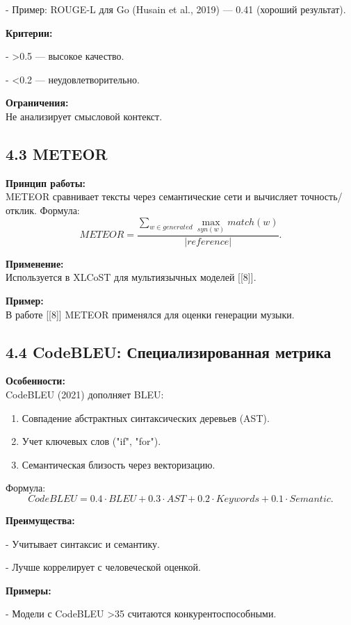 \documentclass[14pt]{article}
\theoremstyle{definition}
\begin{document}
- Пример: ROUGE-L для Go (Husain et al., 2019) — 0.41 (хороший результат).


\textbf{Критерии:}

    
- >0.5 — высокое качество.
    
- <0.2 — неудовлетворительно.


\textbf{Ограничения:} \\
Не анализирует смысловой контекст.

\subsection*{4.3 METEOR}

\textbf{Принцип работы:} \\
METEOR сравнивает тексты через семантические сети и вычисляет точность/отклик. Формула:
\[
METEOR = \frac{\sum_{w \in generated} \max_{syn(w)} match(w)}{|reference|}.
\]

\textbf{Применение:} \\
Используется в XLCoST для мультиязычных моделей [[8]].

\textbf{Пример:} \\
В работе [[8]] METEOR применялся для оценки генерации музыки.

\subsection*{4.4 CodeBLEU: Специализированная метрика}

\textbf{Особенности:} \\
CodeBLEU (2021) дополняет BLEU:
\begin{enumerate}
    \item Совпадение абстрактных синтаксических деревьев (AST).
    \item Учет ключевых слов ("if", "for").
    \item Семантическая близость через векторизацию.
\end{enumerate}

Формула:
\[
CodeBLEU = 0.4 \cdot BLEU + 0.3 \cdot AST + 0.2 \cdot Keywords + 0.1 \cdot Semantic.
\]

\textbf{Преимущества:}

    
- Учитывает синтаксис и семантику.
    
- Лучше коррелирует с человеческой оценкой.


\textbf{Примеры:}

    
- Модели с CodeBLEU >35 считаются конкурентоспособными.
    
\end{document}
